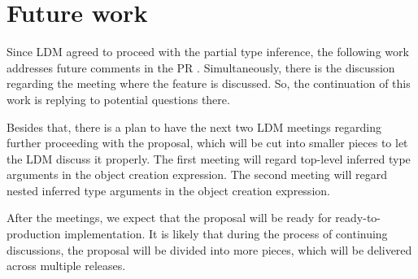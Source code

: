 \chapter{Future work} \label{sect14:future}

Since \ac{LDM} agreed to proceed with the partial type inference, the following work addresses future comments in the PR \cite{online:pull2}. 
Simultaneously, there is the discussion \cite{online:mettingSummaryDisc} regarding the meeting where the feature is discussed. 
So, the continuation of this work is replying to potential questions there.
\par
Besides that, there is a plan to have the next two \ac{LDM} meetings regarding further proceeding with the proposal, which will be cut into smaller pieces to let the LDM discuss it properly. 
The first meeting will regard top-level inferred type arguments in the object creation expression. 
The second meeting will regard nested inferred type arguments in the object creation expression.
\par
After the meetings, we expect that the proposal will be ready for ready-to-production implementation. 
It is likely that during the process of continuing discussions, the proposal will be divided into more pieces, which will be delivered across multiple releases.